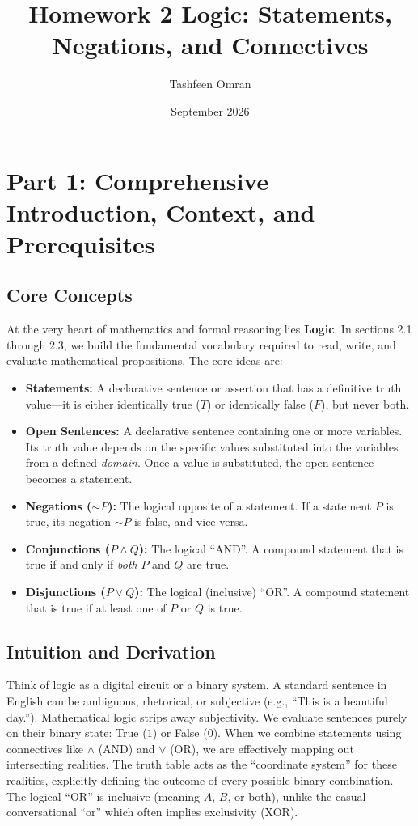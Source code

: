 \documentclass[11pt]{article}
\title{\textbf{Homework 2 Logic: Statements, Negations, and Connectives}}
\author{Tashfeen Omran}
\date{September 2026}
\begin{document}
\maketitle
\tableofcontents
\newpage

\section{Part 1: Comprehensive Introduction, Context, and Prerequisites}

\subsection{Core Concepts}
At the very heart of mathematics and formal reasoning lies \textbf{Logic}. In sections 2.1 through 2.3, we build the fundamental vocabulary required to read, write, and evaluate mathematical propositions. The core ideas are:
\begin{itemize}
    \item \textbf{Statements:} A declarative sentence or assertion that has a definitive truth value—it is either identically true ($T$) or identically false ($F$), but never both. 
    \item \textbf{Open Sentences:} A declarative sentence containing one or more variables. Its truth value depends on the specific values substituted into the variables from a defined \textit{domain}. Once a value is substituted, the open sentence becomes a statement.
    \item \textbf{Negations ($\sim P$):} The logical opposite of a statement. If a statement $P$ is true, its negation $\sim P$ is false, and vice versa. 
    \item \textbf{Conjunctions ($P \land Q$):} The logical ``AND''. A compound statement that is true if and only if \textit{both} $P$ and $Q$ are true.
    \item \textbf{Disjunctions ($P \lor Q$):} The logical (inclusive) ``OR''. A compound statement that is true if at least one of $P$ or $Q$ is true. 
\end{itemize}

\subsection{Intuition and Derivation}
Think of logic as a digital circuit or a binary system. A standard sentence in English can be ambiguous, rhetorical, or subjective (e.g., ``This is a beautiful day.''). Mathematical logic strips away subjectivity. We evaluate sentences purely on their binary state: True ($1$) or False ($0$). 
When we combine statements using connectives like $\land$ (AND) and $\lor$ (OR), we are effectively mapping out intersecting realities. The truth table acts as the ``coordinate system'' for these realities, explicitly defining the outcome of every possible binary combination. The logical ``OR'' is inclusive (meaning $A$, $B$, or both), unlike the casual conversational ``or'' which often implies exclusivity (XOR).
\end{document}
